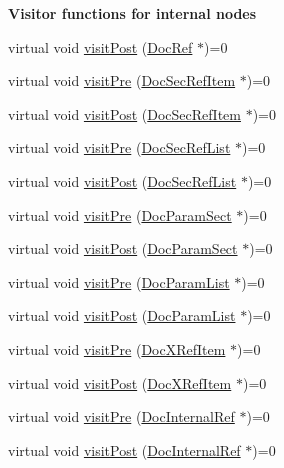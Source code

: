 \begin{Indent}{\bf Visitor functions for internal nodes}
\begin{DoxyCompactItemize}
\item 
virtual void \hyperlink{class_doc_visitor_a94dc480549e1cba2cdbb6185fb0415e3}{visit\+Post} (\hyperlink{class_doc_ref}{Doc\+Ref} $\ast$)=0
\item 
virtual void \hyperlink{class_doc_visitor_a7c8e4f5703c35adb516e9061fa7d79fc}{visit\+Pre} (\hyperlink{class_doc_sec_ref_item}{Doc\+Sec\+Ref\+Item} $\ast$)=0
\item 
virtual void \hyperlink{class_doc_visitor_ac84c8321aebb6766504bd7edc42bbb2f}{visit\+Post} (\hyperlink{class_doc_sec_ref_item}{Doc\+Sec\+Ref\+Item} $\ast$)=0
\item 
virtual void \hyperlink{class_doc_visitor_a3a65706be79641bbe4814420eaa75d94}{visit\+Pre} (\hyperlink{class_doc_sec_ref_list}{Doc\+Sec\+Ref\+List} $\ast$)=0
\item 
virtual void \hyperlink{class_doc_visitor_a9044bae893e45b52b19580b2a28e559c}{visit\+Post} (\hyperlink{class_doc_sec_ref_list}{Doc\+Sec\+Ref\+List} $\ast$)=0
\item 
virtual void \hyperlink{class_doc_visitor_aa6d880a9d15c8616fe9b8f7925faef89}{visit\+Pre} (\hyperlink{class_doc_param_sect}{Doc\+Param\+Sect} $\ast$)=0
\item 
virtual void \hyperlink{class_doc_visitor_a99c29894be00f3b556ba1e6bf6088768}{visit\+Post} (\hyperlink{class_doc_param_sect}{Doc\+Param\+Sect} $\ast$)=0
\item 
virtual void \hyperlink{class_doc_visitor_ace499f22ad300ce1313f858a591d53ee}{visit\+Pre} (\hyperlink{class_doc_param_list}{Doc\+Param\+List} $\ast$)=0
\item 
virtual void \hyperlink{class_doc_visitor_a957c7b7854102aed146f3af8d75bb117}{visit\+Post} (\hyperlink{class_doc_param_list}{Doc\+Param\+List} $\ast$)=0
\item 
virtual void \hyperlink{class_doc_visitor_ae3054c66ebab48aa4fef883fdb6712a1}{visit\+Pre} (\hyperlink{class_doc_x_ref_item}{Doc\+X\+Ref\+Item} $\ast$)=0
\item 
virtual void \hyperlink{class_doc_visitor_af1c08e371fec0b927fa23c0ebd64cd20}{visit\+Post} (\hyperlink{class_doc_x_ref_item}{Doc\+X\+Ref\+Item} $\ast$)=0
\item 
virtual void \hyperlink{class_doc_visitor_a23526fe607d116ecdf0b3b6786d88754}{visit\+Pre} (\hyperlink{class_doc_internal_ref}{Doc\+Internal\+Ref} $\ast$)=0
\item 
virtual void \hyperlink{class_doc_visitor_a6327b76bf49466890f8be949dbf38c9e}{visit\+Post} (\hyperlink{class_doc_internal_ref}{Doc\+Internal\+Ref} $\ast$)=0
\item 

\end{DoxyCompactItemize}
\end{Indent}

